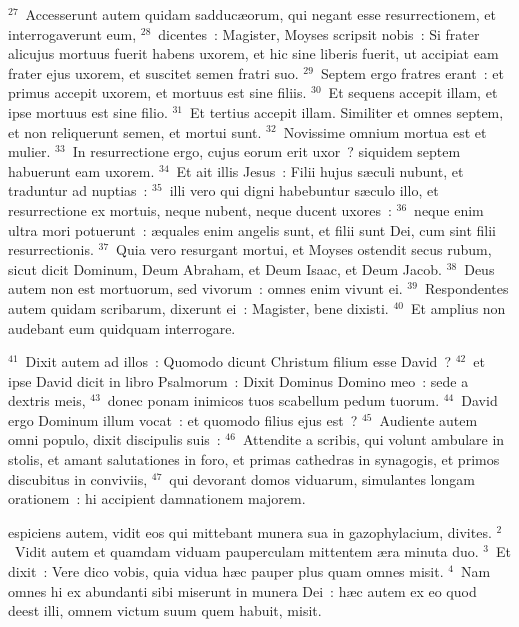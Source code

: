${}^{27}$~Accesserunt autem quidam sadduc\ae orum, qui negant esse resurrectionem, et interrogaverunt eum,
${}^{28}$~dicentes~: Magister, Moyses scripsit nobis~: Si frater alicujus mortuus fuerit habens uxorem, et hic sine liberis fuerit, ut accipiat eam frater ejus uxorem, et suscitet semen fratri suo.
${}^{29}$~Septem ergo fratres erant~: et primus accepit uxorem, et mortuus est sine filiis.
${}^{30}$~Et sequens accepit illam, et ipse mortuus est sine filio.
${}^{31}$~Et tertius accepit illam. Similiter et omnes septem, et non reliquerunt semen, et mortui sunt.
${}^{32}$~Novissime omnium mortua est et mulier.
${}^{33}$~In resurrectione ergo, cujus eorum erit uxor~? siquidem septem habuerunt eam uxorem.
${}^{34}$~Et ait illis Jesus~: Filii hujus s\ae culi nubunt, et traduntur ad nuptias~:
${}^{35}$~illi vero qui digni habebuntur s\ae culo illo, et resurrectione ex mortuis, neque nubent, neque ducent uxores~:
${}^{36}$~neque enim ultra mori potuerunt~: \ae quales enim angelis sunt, et filii sunt Dei, cum sint filii resurrectionis.
${}^{37}$~Quia vero resurgant mortui, et Moyses ostendit secus rubum, sicut dicit Dominum, Deum Abraham, et Deum Isaac, et Deum Jacob.
${}^{38}$~Deus autem non est mortuorum, sed vivorum~: omnes enim vivunt ei.
${}^{39}$~Respondentes autem quidam scribarum, dixerunt ei~: Magister, bene dixisti.
${}^{40}$~Et amplius non audebant eum quidquam interrogare.


${}^{41}$~Dixit autem ad illos~: Quomodo dicunt Christum filium esse David~?
${}^{42}$~et ipse David dicit in libro Psalmorum~: Dixit Dominus Domino meo~: sede a dextris meis,
${}^{43}$~donec ponam inimicos tuos scabellum pedum tuorum.
${}^{44}$~David ergo Dominum illum vocat~: et quomodo filius ejus est~?
${}^{45}$~Audiente autem omni populo, dixit discipulis suis~:
${}^{46}$~Attendite a scribis, qui volunt ambulare in stolis, et amant salutationes in foro, et primas cathedras in synagogis, et primos discubitus in conviviis,
${}^{47}$~qui devorant domos viduarum, simulantes longam orationem~: hi accipient damnationem majorem.

\bchapter
{}espiciens autem, vidit eos qui mittebant munera sua in gazophylacium, divites.
${}^{2}$~Vidit autem et quamdam viduam pauperculam mittentem \ae ra minuta duo.
${}^{3}$~Et dixit~: Vere dico vobis, quia vidua h\ae c pauper plus quam omnes misit.
${}^{4}$~Nam omnes hi ex abundanti sibi miserunt in munera Dei~: h\ae c autem ex eo quod deest illi, omnem victum suum quem habuit, misit.


